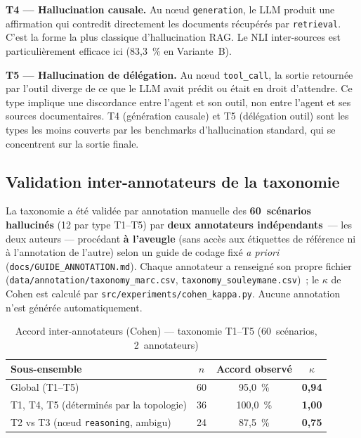 \documentclass[12pt,a4paper]{article}
\begin{document}
\textbf{T4 --- Hallucination causale.}
Au nœud \texttt{generation}, le LLM produit une affirmation qui contredit directement les documents récupérés par \texttt{retrieval}. C'est la forme la plus classique d'hallucination RAG. Le NLI inter-sources est particulièrement efficace ici (83,3~\% en Variante~B).

\textbf{T5 --- Hallucination de délégation.}
Au nœud \texttt{tool\_call}, la sortie retournée par l'outil diverge de ce que le LLM avait prédit ou était en droit d'attendre. Ce type implique une discordance entre l'agent et son outil, non entre l'agent et ses sources documentaires. T4 (génération causale) et T5 (délégation outil) sont les types les moins couverts par les benchmarks d'hallucination standard, qui se concentrent sur la sortie finale.

\subsection{Validation inter-annotateurs de la taxonomie}

La taxonomie a été validée par annotation manuelle des \textbf{60~scénarios hallucinés} (12 par type T1--T5) par \textbf{deux annotateurs indépendants}~--- les deux auteurs --- procédant \textbf{à l'aveugle} (sans accès aux étiquettes de référence ni à l'annotation de l'autre) selon un guide de codage fixé \textit{a priori} (\texttt{docs/GUIDE\_ANNOTATION.md}). Chaque annotateur a renseigné son propre fichier (\texttt{data/annotation/taxonomy\_marc.csv}, \texttt{taxonomy\_souleymane.csv})~; le $\kappa$ de Cohen est calculé par \texttt{src/experiments/cohen\_kappa.py}. Aucune annotation n'est générée automatiquement.

\begin{table}[H]
\centering
\caption{Accord inter-annotateurs (Cohen) --- taxonomie T1--T5 (60~scénarios, 2~annotateurs)}
\label{tab:kappa}
\begin{tabular}{lccc}
\toprule
\textbf{Sous-ensemble} & \textbf{$n$} & \textbf{Accord observé} & \textbf{$\kappa$} \\
\midrule
\rowcolor{highlight}
Global (T1--T5)                 & 60 & 95,0~\% & \textbf{0,94} \\
T1, T4, T5 (déterminés par la topologie) & 36 & 100,0~\% & \textbf{1,00} \\
T2 vs T3 (nœud \texttt{reasoning}, ambigu) & 24 & 87,5~\% & \textbf{0,75} \\
\bottomrule
\end{tabular}
\end{table}
\end{document}
